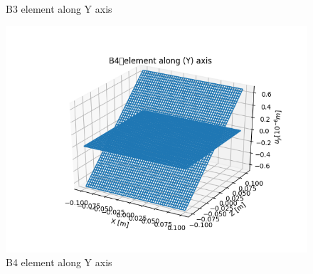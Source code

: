 \documentclass[a4paper,12pt]{article}
\begin{document}
\begin{figure}[!htbp]
\begin{minipage}[b]{0.45\textwidth}
    \caption{B3 element along Y axis}
    \label{fig: Y_B3}
  \end{minipage}
  \hfill
  \begin{minipage}[b]{0.45\textwidth}
    \includegraphics[width=\textwidth]{17.png}
    \caption{B4 element along Y axis}
    \label{fig: Y_B4}
  \end{minipage}
\end{figure}
\end{document}
